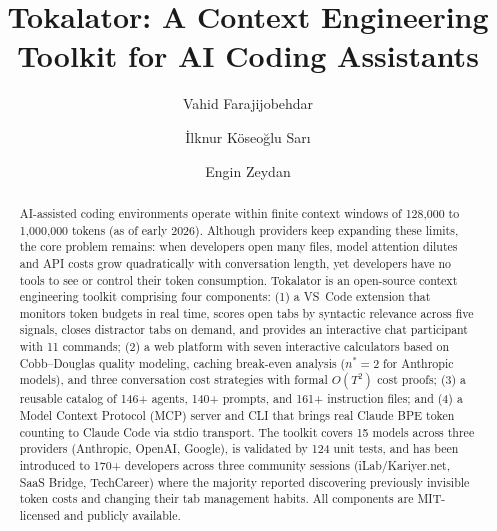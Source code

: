 \documentclass[a4paper,fleqn]{cas-dc}
\begin{document}
\let\WriteBookmarks\relax
\renewcommand{\labelenumii}{\arabic{enumi}.\arabic{enumii}}


\title{Tokalator: A Context Engineering Toolkit for {AI} Coding Assistants}



\author[1]{Vahid Farajijobehdar}
\cormark[1]

\author[1]{İlknur Köseoğlu Sarı}

\author[2]{Engin Zeydan}




\begin{abstract}
AI-assisted coding environments operate within finite context windows of 128,000 to 1,000,000 tokens (as of early 2026). Although providers keep expanding these limits, the core problem remains: when developers open many files, model attention dilutes and API costs grow quadratically with conversation length, yet developers have no tools to see or control their token consumption. Tokalator is an open-source context engineering toolkit comprising four components: (1) a VS~Code extension that monitors token budgets in real time, scores open tabs by syntactic relevance across five signals, closes distractor tabs on demand, and provides an interactive chat participant with 11 commands; (2) a web platform with seven interactive calculators based on Cobb–Douglas quality modeling, caching break-even analysis ($n^* = 2$ for Anthropic models), and three conversation cost strategies with formal $O(T^2)$ cost proofs; (3) a reusable catalog of 146+ agents, 140+ prompts, and 161+ instruction files; and (4) a Model Context Protocol (MCP) server and CLI that brings real Claude BPE token counting to Claude Code via stdio transport. The toolkit covers 15 models across three providers (Anthropic, OpenAI, Google), is validated by 124 unit tests, and has been introduced to 170+ developers across three community sessions (iLab/Kariyer.net, SaaS Bridge, TechCareer) where the majority reported discovering previously invisible token costs and changing their tab management habits. All components are MIT-licensed and publicly available.

\end{abstract}
\end{document}
